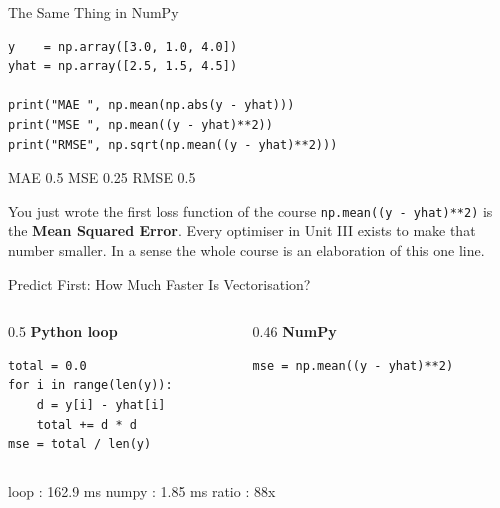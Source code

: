 \documentclass[aspectratio=169]{beamer}
\begin{document}
\begin{frame}[fragile,shrink=10]{The Same Thing in NumPy}
  \begin{lstlisting}
y    = np.array([3.0, 1.0, 4.0])
yhat = np.array([2.5, 1.5, 4.5])

print("MAE ", np.mean(np.abs(y - yhat)))
print("MSE ", np.mean((y - yhat)**2))
print("RMSE", np.sqrt(np.mean((y - yhat)**2)))
  \end{lstlisting}
  \begin{outblk}
MAE  0.5
MSE  0.25
RMSE 0.5
  \end{outblk}
  \vspace{0.2em}
  \begin{block}{You just wrote the first loss function of the course}
    \texttt{np.mean((y - yhat)**2)} is the \textbf{Mean Squared Error}. Every
    optimiser in Unit III exists to make that number smaller. In a sense the
    whole course is an elaboration of this one line.
  \end{block}
\end{frame}

\begin{frame}[fragile,shrink=6]{Predict First: How Much Faster Is Vectorisation?}
  \begin{columns}[T]
    \begin{column}{0.5\textwidth}
      \textbf{Python loop}
      \begin{lstlisting}
total = 0.0
for i in range(len(y)):
    d = y[i] - yhat[i]
    total += d * d
mse = total / len(y)
      \end{lstlisting}
    \end{column}
    \begin{column}{0.46\textwidth}
      \textbf{NumPy}
      \begin{lstlisting}
mse = np.mean((y - yhat)**2)
      \end{lstlisting}
      \vspace{0.6em}
    \end{column}
  \end{columns}
  \vspace{0.3em}
  \begin{outblk}
loop  :    162.9 ms
numpy :      1.85 ms
ratio :       88x
  \end{outblk}
  \vspace{0.1em}
\end{frame}
\end{document}

